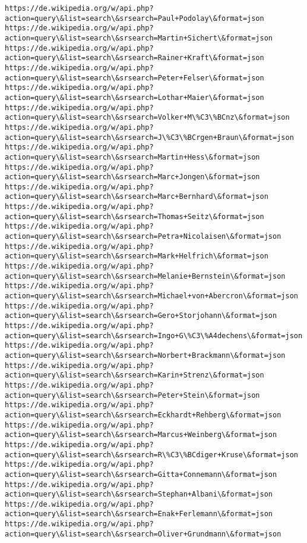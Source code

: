 \documentclass[11pt]{article}
\begin{document}
\begin{Verbatim}[commandchars=\\\{\}]
https://de.wikipedia.org/w/api.php?action=query\&list=search\&srsearch=Paul+Podolay\&format=json
https://de.wikipedia.org/w/api.php?action=query\&list=search\&srsearch=Martin+Sichert\&format=json
https://de.wikipedia.org/w/api.php?action=query\&list=search\&srsearch=Rainer+Kraft\&format=json
https://de.wikipedia.org/w/api.php?action=query\&list=search\&srsearch=Peter+Felser\&format=json
https://de.wikipedia.org/w/api.php?action=query\&list=search\&srsearch=Lothar+Maier\&format=json
https://de.wikipedia.org/w/api.php?action=query\&list=search\&srsearch=Volker+M\%C3\%BCnz\&format=json
https://de.wikipedia.org/w/api.php?action=query\&list=search\&srsearch=J\%C3\%BCrgen+Braun\&format=json
https://de.wikipedia.org/w/api.php?action=query\&list=search\&srsearch=Martin+Hess\&format=json
https://de.wikipedia.org/w/api.php?action=query\&list=search\&srsearch=Marc+Jongen\&format=json
https://de.wikipedia.org/w/api.php?action=query\&list=search\&srsearch=Marc+Bernhard\&format=json
https://de.wikipedia.org/w/api.php?action=query\&list=search\&srsearch=Thomas+Seitz\&format=json
https://de.wikipedia.org/w/api.php?action=query\&list=search\&srsearch=Petra+Nicolaisen\&format=json
https://de.wikipedia.org/w/api.php?action=query\&list=search\&srsearch=Mark+Helfrich\&format=json
https://de.wikipedia.org/w/api.php?action=query\&list=search\&srsearch=Melanie+Bernstein\&format=json
https://de.wikipedia.org/w/api.php?action=query\&list=search\&srsearch=Michael+von+Abercron\&format=json
https://de.wikipedia.org/w/api.php?action=query\&list=search\&srsearch=Gero+Storjohann\&format=json
https://de.wikipedia.org/w/api.php?action=query\&list=search\&srsearch=Ingo+G\%C3\%A4dechens\&format=json
https://de.wikipedia.org/w/api.php?action=query\&list=search\&srsearch=Norbert+Brackmann\&format=json
https://de.wikipedia.org/w/api.php?action=query\&list=search\&srsearch=Karin+Strenz\&format=json
https://de.wikipedia.org/w/api.php?action=query\&list=search\&srsearch=Peter+Stein\&format=json
https://de.wikipedia.org/w/api.php?action=query\&list=search\&srsearch=Eckhardt+Rehberg\&format=json
https://de.wikipedia.org/w/api.php?action=query\&list=search\&srsearch=Marcus+Weinberg\&format=json
https://de.wikipedia.org/w/api.php?action=query\&list=search\&srsearch=R\%C3\%BCdiger+Kruse\&format=json
https://de.wikipedia.org/w/api.php?action=query\&list=search\&srsearch=Gitta+Connemann\&format=json
https://de.wikipedia.org/w/api.php?action=query\&list=search\&srsearch=Stephan+Albani\&format=json
https://de.wikipedia.org/w/api.php?action=query\&list=search\&srsearch=Enak+Ferlemann\&format=json
https://de.wikipedia.org/w/api.php?action=query\&list=search\&srsearch=Oliver+Grundmann\&format=json

\end{Verbatim}
\end{document}
